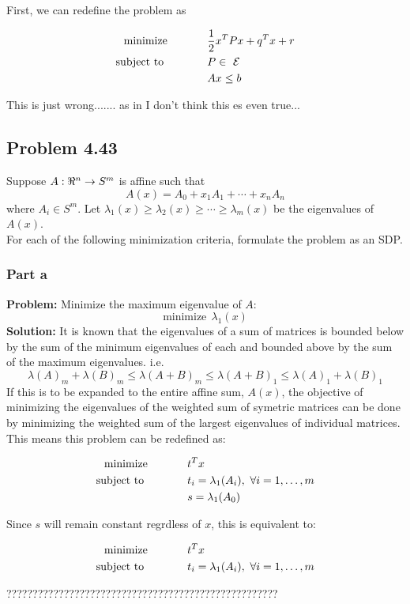 \documentclass[letter]{article}
\newcommand{\optpblm}[3][eq:default]{
	\begin{equation}\label{#1}
		\begin{aligned}
			\text{minimize} \hspace{0.5in} &#2\vspace{5pt}\\
			\text{subject to \hspace{0.5in}} &#3
		\end{aligned}	
	\end{equation}
}
\begin{document}
First, we can redefine the problem as
\optpblm{\frac{1}{2} x^T P x + q^T x + r}{
	P \in\ \mathcal{E}\\
	&Ax \leq b}

This is just wrong....... as in I don't think this es even true...













\newpage
\subsection{Problem 4.43}
Suppose $A: \real^n \to S^m$ is affine such that
\begin{equation}
	A(x) = A_0 + x_1 A_1 + \cdots + x_n A_n
\end{equation}
where $A_i \in S^m$. Let $\lambda_1(x) \geq \lambda_2(x) \geq \cdots \geq \lambda_m(x)$ be the eigenvalues of $A(x)$.\\


For each of the following minimization criteria, formulate the problem as an SDP.\\

\subsubsection{Part a}
\textbf{Problem:}
Minimize the maximum eigenvalue of $A$: $$\text{minimize} \ \ \lambda_1(x)$$
\textbf{Solution:}
It is known that the eigenvalues of a sum of matrices is bounded below by the sum of the minimum eigenvalues of each and bounded above by the sum of the maximum eigenvalues.
\cite{eigvalueBound}
i.e.
$$ \lambda(A)_m + \lambda(B)_m \leq \lambda(A+B)_m \leq \lambda(A+B)_1 \leq \lambda(A)_1 + \lambda(B)_1$$
If this is to be expanded to the entire affine sum, $A(x)$, the objective of minimizing the eigenvalues of the weighted sum of symetric matrices can be done by minimizing the weighted sum of the largest eigenvalues of individual matrices.
This means this problem can be redefined as:
\optpblm{t^T x}{
	t_i = \lambda_1(A_i), \ \forall i = 1,\dots,m\\
	&s = \lambda_1(A_0)}
Since $s$ will remain constant regrdless of $x$, this is equivalent to:
\optpblm{t^T x}{
	t_i = \lambda_1(A_i), \ \forall i = 1,\dots,m}

????????????????????????????????????????????????????
\end{document}
